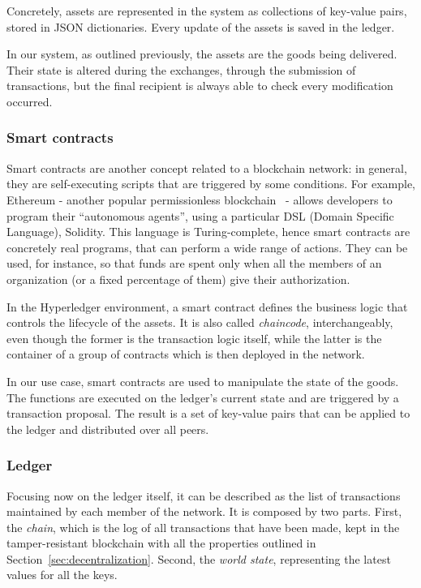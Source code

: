 Concretely, assets are represented in the system as collections of key-value pairs, stored in JSON dictionaries. Every update of the assets is saved in the ledger.

In our system, as outlined previously, the assets are the goods being delivered. Their state is altered during the exchanges, through the submission of transactions, but the final recipient is always able to check every modification occurred.

\subsubsection{Smart contracts}
Smart contracts are another concept related to a blockchain network: in general, they are self-executing scripts that are triggered by some conditions. For example, Ethereum - another popular permissionless blockchain~\cite{ethereum} - allows developers to program their ``autonomous agents'', using a particular DSL (Domain Specific Language), Solidity. This language is Turing-complete, hence smart contracts are concretely real programs, that can perform a wide range of actions. They can be used, for instance, so that funds are spent only when all the members of an organization (or a fixed percentage of them) give their authorization. 

In the Hyperledger environment, a smart contract defines the business logic that controls the lifecycle of the assets. It is also called \emph{chaincode}, interchangeably, even though the former is the transaction logic itself, while the latter is the container of a group of contracts which is then deployed in the network. 

In our use case, smart contracts are used to manipulate the state of the goods. The functions are executed on the ledger’s current state and are triggered by a transaction proposal. The result is a set of key-value pairs that can be applied to the ledger and distributed over all peers.

\subsubsection{Ledger}
Focusing now on the ledger itself, it can be described as the list of transactions maintained by each member of the network. It is composed by two parts. First, the \emph{chain}, which is the log of all transactions that have been made, kept in the tamper-resistant blockchain with all the properties outlined in Section~\ref{sec:decentralization}. Second, the \emph{world state}, representing the latest values for all the keys. 

